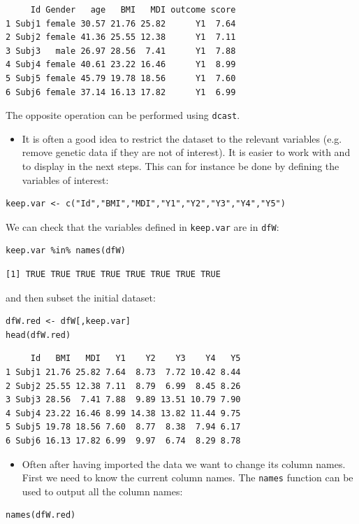 \documentclass{article}
\begin{document}
\begin{verbatim}
     Id Gender   age   BMI   MDI outcome score
1 Subj1 female 30.57 21.76 25.82      Y1  7.64
2 Subj2 female 41.36 25.55 12.38      Y1  7.11
3 Subj3   male 26.97 28.56  7.41      Y1  7.88
4 Subj4 female 40.61 23.22 16.46      Y1  8.99
5 Subj5 female 45.79 19.78 18.56      Y1  7.60
6 Subj6 female 37.14 16.13 17.82      Y1  6.99
\end{verbatim}

The opposite operation can be performed using \texttt{dcast}.

\begin{itemize}
\item It is often a good idea to restrict the dataset to the relevant
variables (e.g. remove genetic data if they are not of interest). It
is easier to work with and to display in the next steps. This can
for instance be done by defining the variables of interest:
\end{itemize}
\lstset{language=r,label= ,caption= ,captionpos=b,numbers=none}
\begin{lstlisting}
keep.var <- c("Id","BMI","MDI","Y1","Y2","Y3","Y4","Y5")
\end{lstlisting}

We can check that the variables defined in \texttt{keep.var} are in \texttt{dfW}:
\lstset{language=r,label= ,caption= ,captionpos=b,numbers=none}
\begin{lstlisting}
keep.var %in% names(dfW)
\end{lstlisting}

\begin{verbatim}
[1] TRUE TRUE TRUE TRUE TRUE TRUE TRUE TRUE
\end{verbatim}

and then subset the initial dataset:
\lstset{language=r,label= ,caption= ,captionpos=b,numbers=none}
\begin{lstlisting}
dfW.red <- dfW[,keep.var]
head(dfW.red)
\end{lstlisting}

\begin{verbatim}
     Id   BMI   MDI   Y1    Y2    Y3    Y4   Y5
1 Subj1 21.76 25.82 7.64  8.73  7.72 10.42 8.44
2 Subj2 25.55 12.38 7.11  8.79  6.99  8.45 8.26
3 Subj3 28.56  7.41 7.88  9.89 13.51 10.79 7.90
4 Subj4 23.22 16.46 8.99 14.38 13.82 11.44 9.75
5 Subj5 19.78 18.56 7.60  8.77  8.38  7.94 6.17
6 Subj6 16.13 17.82 6.99  9.97  6.74  8.29 8.78
\end{verbatim}

\begin{itemize}
\item Often after having imported the data we want to change its column
names. First we need to know the current column names. The \texttt{names}
function can be used to output all the column names:
\end{itemize}
\lstset{language=r,label= ,caption= ,captionpos=b,numbers=none}
\begin{lstlisting}
names(dfW.red)
\end{lstlisting}
\end{document}
